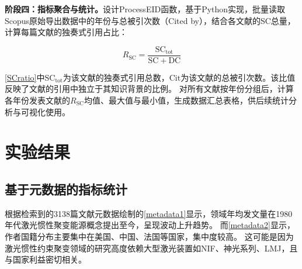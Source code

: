 \documentclass[12pt,hyperref,a4paper,UTF8]{ctexart}
\begin{document}
            \textbf{阶段四：指标聚合与统计。}设计ProcessEID函数，基于Python实现，批量读取Scopus原始导出数据中的年份与总被引次数（Cited by），结合各文献的SC总量，计算每篇文献的独奏式引用占比：

        \begin{equation}
            R_{\mathrm{SC}} = \frac{\mathrm{SC}_{\mathrm{tot}}}{\mathrm{SC+DC}}
            \label{SCratio}
        \end{equation}

        \autoref{SCratio}中$\mathrm{SC_{tot}}$为该文献的独奏式引用总数，$\mathrm{Cit}$为该文献的总被引次数。该比值反映了文献的引用中独立于其知识背景的比例。
        对所有文献按年份分组后，计算各年份发表文献的$R_{\mathrm{SC}}$均值、最大值与最小值，生成数据汇总表格，供后续统计分析与可视化使用。







\section{实验结果}

    \subsection{基于元数据的指标统计}
    根据检索到的3138篇文献元数据绘制的\autoref{metadata1}显示，领域年均发文量在1980年代激光惯性聚变能源概念提出至今，呈现波动上升趋势。
    而\autoref{metadata2}显示，作者国籍分布主要集中在美国、中国、法国等国家，集中度较高。
    这可能是因为激光惯性约束聚变领域的研究高度依赖大型激光装置如NIF、神光系列、LMJ，且与国家利益密切相关。
\end{document}
